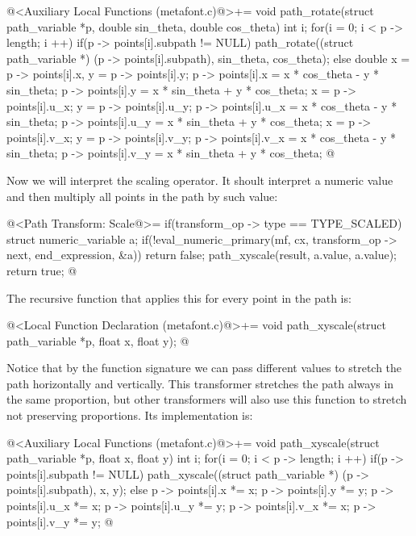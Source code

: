 \iniciocodigo
@<Auxiliary Local Functions (metafont.c)@>+=
void path_rotate(struct path_variable *p, double sin_theta,
                 double cos_theta){
  int i;
  for(i = 0; i < p -> length; i ++){
    if(p -> points[i].subpath != NULL)
      path_rotate((struct path_variable *) (p -> points[i].subpath),
                  sin_theta, cos_theta);
    else{
      double x = p -> points[i].x, y = p -> points[i].y;
      p -> points[i].x = x * cos_theta - y * sin_theta;
      p -> points[i].y = x * sin_theta + y * cos_theta;
      x = p -> points[i].u_x;
      y = p -> points[i].u_y;
      p -> points[i].u_x = x * cos_theta - y * sin_theta;
      p -> points[i].u_y = x * sin_theta + y * cos_theta;
      x = p -> points[i].v_x;
      y = p -> points[i].v_y;
      p -> points[i].v_x = x * cos_theta - y * sin_theta;
      p -> points[i].v_y = x * sin_theta + y * cos_theta;
    }
  }
}
@
\fimcodigo

Now we will interpret the scaling operator. It shoult interpret a
numeric value and then multiply all points in the path by such value:

\iniciocodigo
@<Path Transform: Scale@>=
if(transform_op -> type == TYPE_SCALED){
  struct numeric_variable a;
  if(!eval_numeric_primary(mf, cx, transform_op -> next, end_expression,
                          &a))
    return false;
  path_xyscale(result, a.value, a.value);  
  return true;
}
@
\fimcodigo

The recursive function that applies this for every point in the path
is:

\iniciocodigo
@<Local Function Declaration (metafont.c)@>+=
void path_xyscale(struct path_variable *p, float x, float y);
@
\fimcodigo

Notice that by the function signature we can pass different values to
stretch the path horizontally and vertically. This transformer
stretches the path always in the same proportion, but other
transformers will also use this function to stretch not preserving
proportions. Its implementation is:

\iniciocodigo
@<Auxiliary Local Functions (metafont.c)@>+=
void path_xyscale(struct path_variable *p, float x, float y){
  int i;
  for(i = 0; i < p -> length; i ++){
    if(p -> points[i].subpath != NULL)
      path_xyscale((struct path_variable *) (p -> points[i].subpath), x,
                   y);
    else{
      p -> points[i].x *= x;
      p -> points[i].y *= y;
      p -> points[i].u_x *= x;
      p -> points[i].u_y *= y;
      p -> points[i].v_x *= x;
      p -> points[i].v_y *= y;
    }
  }
}
@
\fimcodigo

